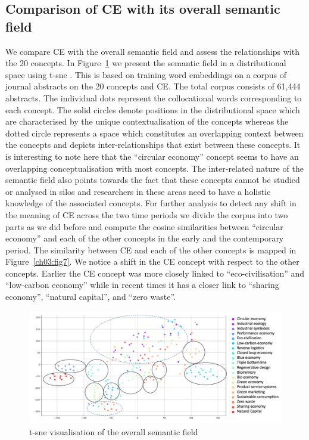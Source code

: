 \documentclass[output=paper]{langsci/langscibook}
\begin{document}
\subsection{Comparison of CE with its overall semantic field}\largerpage[-2]
We compare CE with the overall semantic field and assess the relationships with the 20 concepts. In Figure~\ref{ch03:fig6} we present the semantic field in a distributional space using t-sne \citep{maaten2008visualizing}. This is based on training word embeddings on a corpus of journal abstracts on the 20 concepts and CE. The total corpus consists of 61,444 abstracts. The individual dots represent the collocational words corresponding to each concept. The solid circles denote positions in the distributional space which are characterised by the unique contextualisation of the concepts whereas the dotted circle represents a space which constitutes an overlapping context between the concepts and depicts inter-relationships that exist between these concepts. It is interesting to note here that the ``circular economy'' concept seems to have an overlapping conceptualisation with most concepts. The inter-related nature of the semantic field also points towards the fact that these concepts cannot be studied or analysed in silos and researchers in these areas need to have a holistic knowledge of the associated concepts. For further analysis to detect any shift in the meaning of CE across the two time periods we divide the corpus into two parts as we did before and compute the cosine similarities between ``circular economy'' and each of the other concepts in the early and the contemporary period. The similarity between CE and each of the other concepts is mapped in Figure~\ref{ch03:fig7}. We notice a shift in the CE concept with respect to the other concepts. Earlier the CE concept was more closely linked to ``eco-civilisation'' and ``low-carbon economy'' while in recent times it has a closer link to ``sharing economy'', ``natural capital'', and ``zero waste''.
\begin{figure}
\includegraphics[width=\textwidth]{figures/MAHANTY_tsne2.png}
\caption{t-sne visualisation of the overall semantic field}\label{ch03:fig6}
\end{figure}
\end{document}
